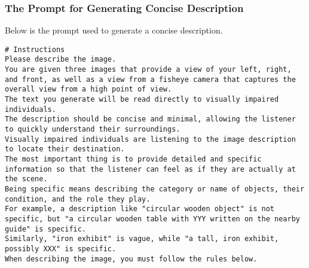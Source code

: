 \subsubsection{The Prompt for Generating Concise Description}
Below is the prompt used to generate a concise description.
\begin{lstlisting}
# Instructions  
Please describe the image.  
You are given three images that provide a view of your left, right, and front, as well as a view from a fisheye camera that captures the overall view from a high point of view.
The text you generate will be read directly to visually impaired individuals.  
The description should be concise and minimal, allowing the listener to quickly understand their surroundings.  
Visually impaired individuals are listening to the image description to locate their destination.  
The most important thing is to provide detailed and specific information so that the listener can feel as if they are actually at the scene.  
Being specific means describing the category or name of objects, their condition, and the role they play.  
For example, a description like "circular wooden object" is not specific, but "a circular wooden table with YYY written on the nearby guide" is specific.  
Similarly, "iron exhibit" is vague, while "a tall, iron exhibit, possibly XXX" is specific.  
When describing the image, you must follow the rules below.


\end{lstlisting}

